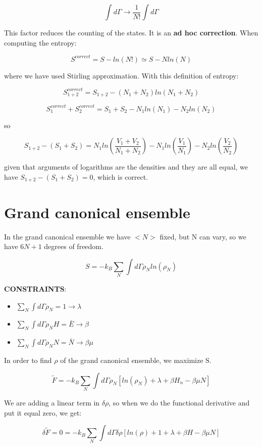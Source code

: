 \documentclass[a4paper, italian, openany]{book}
\begin{document}
$$\int d\Gamma \rightarrow \frac{1}{N!}\int d\Gamma$$

This factor reduces the counting of the states. It is an \textbf{ad hoc correction}. When computing the entropy:

$$S^{correct} = S - ln(N!) \simeq S - Nln(N) $$

where we have used Stirling approximation. With this definition of entropy:

$$S_{1+2}^{correct} = S_{1+2} - (N_1+N_2)ln(N_1+N_2)$$

$$S_{1}^{correct} + S_2^{correct} = S_1 + S_2 - N_1ln(N_1) - N_2 ln(N_2)$$

so

$$S_{1+2}-(S_{1}+S_{2}) = N_1 ln \left ( \frac{V_1+V_2}{N_1+N_2} \right ) - N_1 ln \left ( \frac{V_1}{N_1} \right ) - N_2 ln \left ( \frac{V_2}{N_2}\right )$$

given that arguments of logarithms are the densities and they are all equal, we have $S_{1+2}-(S_{1}+S_{2}) = 0$, which is correct.

\section{Grand canonical ensemble}

In the grand canonical ensemble we have $<N>$ fixed, but N can vary, so we have $6N+1$ degrees of freedom.

$$S = -k_B \sum_N \int d\Gamma \rho_N ln \left ( \rho_N \right )$$

\textbf{CONSTRAINTS}:
\begin{itemize}
\item $\sum_N \int d\Gamma \rho_N =1 \rightarrow \lambda$
\item $\sum_N \int d\Gamma \rho_N H = \bar{E} \rightarrow \beta$
\item $\sum_N \int d\Gamma \rho_N N = \bar{N} \rightarrow \beta \mu$
\end{itemize}

In order to find $\rho$ of the grand canonical ensemble, we maximize S.

$$\tilde{F} = - k_B \sum_N \int d\Gamma \rho_N \left [ ln\left ( \rho_N \right ) + \lambda + \beta H_n - \beta \mu N \right ]$$

We are adding a linear term in $\delta \rho$, so when we do the functional derivative and put it equal zero, we get:

$$\delta \tilde{F} = 0 = -k_B \sum_N \int d\Gamma \delta \rho \left [ ln \left ( \rho \right ) + 1 + \lambda + \beta H - \beta \mu N\right ]$$
\end{document}
